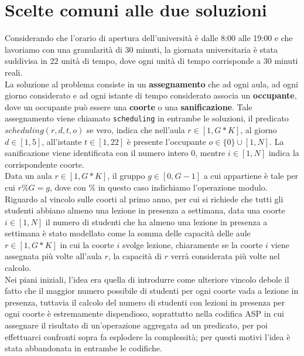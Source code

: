 \documentclass[12pt, italian, openany]{book}
\begin{document}
\chapter{Scelte comuni alle due soluzioni}
Considerando che l'orario di apertura dell'università è dalle 8:00 alle 19:00 e che lavoriamo con una granularità di 30 minuti, la giornata universitaria è stata suddivisa in $22$ unità di tempo, dove ogni unità di tempo corrisponde a 30 minuti reali.\\
La soluzione al problema consiste in un \textbf{assegnamento} che ad ogni aula, ad ogni giorno considerato e ad ogni istante di tempo considerato associa un \textbf{occupante}, dove un occupante può essere una \textbf{coorte} o una \textbf{sanificazione}. Tale assegnamento viene chiamato \texttt{scheduling} in entrambe le soluzioni, il predicato $scheduling(r,d,t,o)$ se vero, indica che nell'aula $r \in \left[1, G*K \right]$, al giorno $d \in \left[1, 5 \right]$, all'istante $t \in \left[ 1, 22 \right]$ è presente l'occupante $o \in \lbrace 0 \rbrace \cup \left[1, N \right]$.
La sanificazione viene identificata con il numero intero $0$, mentre $i \in \left[1, N \right]$ indica la corrispondente coorte.\\
Data un aula $r \in \left[1, G*K \right]$, il gruppo $g \in \left[0, G-1\right]$ a cui appartiene è tale per cui $r \% G = g$, dove con $\%$ in questo caso indichiamo l'operazione modulo.\\
Riguardo al vincolo sulle coorti al primo anno, per cui si richiede che tutti gli studenti abbiano almeno una lezione in presenza a settimana, data una coorte $i \in \left[1, N\right]$ il numero di studenti che ha almeno una lezione in presenza a settimana è stato modellato come la somma delle capacità delle aule $r \in \left[1, G*K\right]$ in cui la coorte $i$ svolge lezione, chiaramente se la coorte $i$ viene assegnata più volte all'aula $r$, la capacità di $r$ verrà considerata più volte nel calcolo.\\
Nei piani iniziali, l'idea era quella di introdurre come ulteriore vincolo debole il fatto che il maggior numero possibile di studenti per ogni coorte vada a lezione in presenza, tuttavia il calcolo del numero di studenti con lezioni in presenza per ogni coorte è estremamente dispendioso, soprattutto nella codifica ASP in cui assegnare il risultato di un'operazione aggregata ad un predicato, per poi effettuarci confronti sopra fa esplodere la complessità; per questi motivi l'idea è stata abbandonata in entrambe le codifiche.\\
\end{document}
